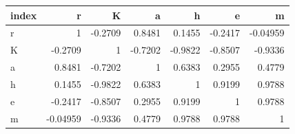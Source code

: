 \begin{tabular}{lrrrrrr}
\toprule
index & r & K & a & h & e & m \\
\midrule
r & 1 & -0.2709 & 0.8481 & 0.1455 & -0.2417 & -0.04959 \\
K & -0.2709 & 1 & -0.7202 & -0.9822 & -0.8507 & -0.9336 \\
a & 0.8481 & -0.7202 & 1 & 0.6383 & 0.2955 & 0.4779 \\
h & 0.1455 & -0.9822 & 0.6383 & 1 & 0.9199 & 0.9788 \\
e & -0.2417 & -0.8507 & 0.2955 & 0.9199 & 1 & 0.9788 \\
m & -0.04959 & -0.9336 & 0.4779 & 0.9788 & 0.9788 & 1 \\
\bottomrule
\end{tabular}
